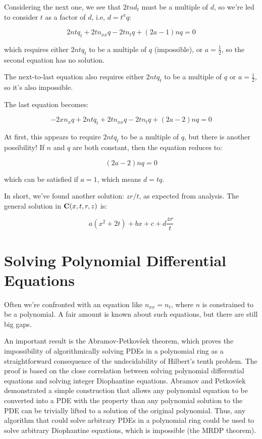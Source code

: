 \documentclass{article}
\newcommand{\C}{\ensuremath{{\bf C}}}
\begin{document}
Considering the next one, we see that $2tnd_t$ must be a multiple of $d$, so we're led to
consider $t$ as a factor of $d$, i.e, $d=t^a q$:

$$2nt q_t + 2tn_{xx}q -2tn_tq +(2a-1)nq = 0$$

which requires either $2ntq_t$ to be a multiple of $q$ (impossible), or $a=\frac{1}{2}$,
so the second equation has no solution.

The next-to-last equation also requires either $2ntq_t$ to be a multiple of $q$ or $a=\frac{1}{2}$, so it's also impossible.

The last equation becomes:


$$-2xn_xq  + 2 n t q_t +2tn_{xx}q -2tn_tq +(2a-2)nq = 0$$

At first, this appears to require $2ntq_t$ to be a multiple of $q$, but there is another possibility!
If $n$ and $q$ are both constant, then the equation reduces to:

$$(2a-2)nq = 0$$

which can be satisfied if $a=1$, which means $d=tq$.

In short, we've found another solution: $zr/t$, as expected from analysis.
The general solution in $\C(x,t,r,z)$ is:

$$a(x^2+2t)+bx+c+d\frac{zr}{t}$$


\vfill\eject

\section*{Solving Polynomial Differential Equations}

Often we're confronted with an equation like $n_{xx} = n_t$, where $n$
is constrained to be a polynomial.  A fair amount is known about
such equations, but there are still big gaps.

An important result is the Abramov-Petkov\v sek theorem, which proves
the impossibility of algorithmically solving PDEs in a polynomial ring
as a straightforward consequence of the undecidability of Hilbert's
tenth problem.  The proof is based on the close correlation between
solving polynomial differential equations and solving integer Diophantine
equations.  Abramov and Petkov\v sek demonstrated a simple
construction that allows any polynomial equation to be converted
into a PDE with the property than any polynomial solution to the PDE
can be trivially lifted to a solution of the original polynomial.
Thus, any algorithm that could solve arbitrary PDEs in a polynomial
ring could be used to solve arbitrary Diophantine equations, which
is impossible (the MRDP theorem).
\end{document}
